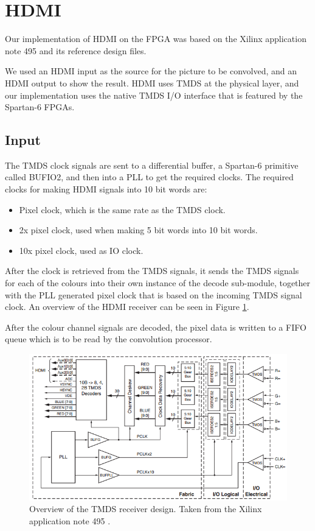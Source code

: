 \section{HDMI}
Our implementation of HDMI on the FPGA was based on the Xilinx application note 495 \cite{xapp495} and its reference design files.

We used an HDMI input as the source for the picture to be convolved, and an HDMI output to show the result.
HDMI uses TMDS at the physical layer, and our implementation uses the native TMDS I/O interface that is featured by the Spartan-6 FPGAs.

\subsection{Input}
The TMDS clock signals are sent to a differential buffer, a Spartan-6 primitive called BUFIO2, and then into a PLL to get the required clocks. The required clocks for making HDMI signals into 10 bit words are:
\begin{itemize}
    \item   Pixel clock, which is the same rate as the TMDS clock.
    \item   2x pixel clock, used when making 5 bit words into 10 bit words.
    \item   10x pixel clock, used as IO clock.
\end{itemize}

After the clock is retrieved from the TMDS signals, it sends the TMDS signals for each of the colours into their own instance of the decode sub-module, together with the PLL generated pixel clock that is based on the incoming TMDS signal clock.
An overview of the HDMI receiver can be seen in Figure \ref{fig:TMDSReceiver}.

After the colour channel signals are decoded, the pixel data is written to a FIFO queue which is to be read by the convolution processor.

\begin{figure}[h!]
    \centering
    \includegraphics[width=\linewidth]{img/TMDSreceiverdesign.png}
    \caption[Overview of the TMDS receiver design.]{Overview of the TMDS receiver design. Taken from the Xilinx application note 495 \cite{xapp495}.}
    \label{fig:TMDSReceiver}
\end{figure}


